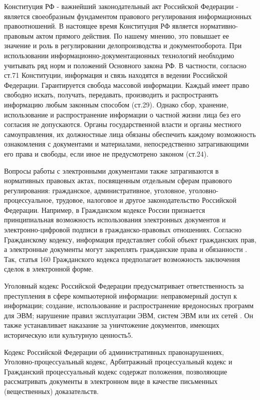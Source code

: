 Конституция РФ \cite{constitution} - важнейший законодательный акт Российской Федерации - является своеобразным фундаментом правового регулирования информационных правоотношений. В настоящее время Конституция РФ является нормативно-правовым актом прямого действия. По нашему мнению, это повышает ее значение и роль в регулировании делопроизводства и документооборота. При использовании информационно-документационных технологий необходимо учитывать ряд норм и положений Основного закона РФ. В частности, согласно ст.71 Конституции, информация и связь находятся в ведении Российской Федерации. Гарантируется свобода массовой информации. Каждый имеет право свободно искать, получать, передавать, производить и распространять информацию любым законным способом (ст.29). Однако сбор, хранение, использование и распространение информации о частной жизни лица без его согласия не допускаются. Органы государственной власти и органы местного самоуправления, их должностные лица обязаны обеспечить каждому возможность ознакомления с документами и материалами, непосредственно затрагивающими его права и свободы, если иное не предусмотрено законом (ст.24).

Вопросы работы с электронными документами также затрагиваются в нормативных правовых актах, посвященным отдельным сферам правового регулирования: гражданское, административное, уголовное, уголовно-процессуальное, трудовое, налоговое и другое законодательство Российской Федерации. Например, в Гражданском кодексе России признается принципиальная возможность использования электронных документов и электронно-цифровой подписи в гражданско-правовых отношениях. Согласно Гражданскому кодексу, информация представляет собой объект гражданских прав, а электронные документы могут закреплять гражданские права и обязанности \cite{grcodex}. Так, статья 160 Гражданского кодекса предполагает возможность заключения сделок в электронной форме.

Уголовный кодекс Российской Федерации предусматривает ответственность за преступления в сфере компьютерной информации: неправомерный доступ к информации; создание, использование и распространение вредоносных программ для ЭВМ; нарушение правил эксплуатации ЭВМ, систем ЭВМ или их сетей \cite{ugcodex}. Он также устанавливает наказание за уничтожение документов, имеющих историческую или культурную ценность5.

Кодекс Российской Федерации об административных правонарушениях\cite{admcodex}, Уголовно-процессуальный кодекс\cite{upcodex}, Арбитражный процессуальный кодекс и Гражданский процессуальный кодекс содержат положения, позволяющие рассматривать документы в электронном виде в качестве письменных (вещественных) доказательств.

